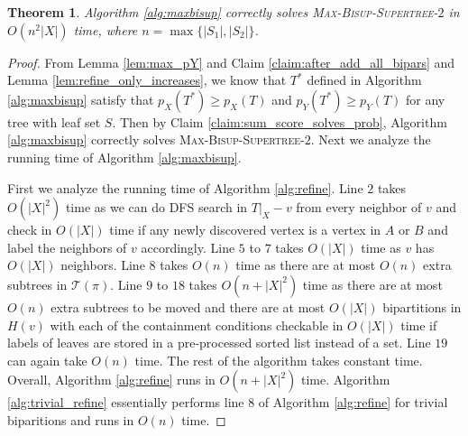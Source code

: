 \documentclass{bmcart}
\newtheorem{theorem}{Theorem}
\begin{document}
\begin{theorem}\label{thm:correctness_alg}
Algorithm \ref{alg:maxbisup} correctly solves \textsc{Max-Bisup-Supertree-$2$} in $O(n^2|X|)$ time, where $n=\max\{|S_1|,|S_2|\}$.
\end{theorem}
\begin{proof}
From Lemma \ref{lem:max_pY} and Claim \ref{claim:after_add_all_bipars} and Lemma \ref{lem:refine_only_increases}, we know that $T^*$ defined in Algorithm \ref{alg:maxbisup} satisfy that $p_X(T^*) \ge p_X(T)$ and $p_Y(T^*) \ge p_Y(T)$ for any tree with leaf set $S$. Then by Claim \ref{claim:sum_score_solves_prob}, Algorithm \ref{alg:maxbisup} correctly solves \textsc{Max-Bisup-Supertree-$2$}. Next we analyze the running time of Algorithm \ref{alg:maxbisup}.

First we analyze the running time of Algorithm \ref{alg:refine}. Line $2$ takes $O(|X|^2)$ time as we can do DFS search in $T|_X - v$ from every neighbor of $v$ and check in $O(|X|)$ time if any newly discovered vertex is a vertex in $A$ or $B$ and label the neighbors of $v$ accordingly. Line $5$ to $7$ takes $O(|X|)$ time as $v$ has $O(|X|)$ neighbors. Line $8$ takes $O(n)$ time as there are at most $O(n)$ extra subtrees in $\mathcal{T}(\pi)$. Line $9$ to $18$ takes $O(n+|X|^2 )$ time as there are at most $O(n)$ extra subtrees to be moved and there are at most $O(|X|)$ bipartitions in $H(v)$ with each of the containment conditions checkable in $O(|X|)$ time if labels of leaves are stored in a pre-processed sorted list instead of a set. Line $19$ can again take $O(n)$ time. The rest of the algorithm takes constant time. Overall, Algorithm \ref{alg:refine} runs in $O(n + |X|^2)$ time. Algorithm \ref{alg:trivial_refine} essentially performs line $8$ of Algorithm \ref{alg:refine} for trivial biparitions and runs in $O(n)$ time.


\end{proof}
\end{document}
